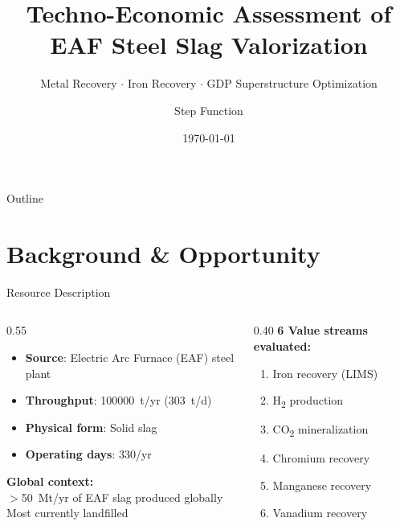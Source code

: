 \documentclass[aspectratio=169]{beamer}
\title{Techno-Economic Assessment of\\[4pt] \textbf{EAF Steel Slag} Valorization}
\subtitle{Metal Recovery \(\cdot\) Iron Recovery \(\cdot\) GDP Superstructure Optimization}
\author{Step Function}
\date{\today}
\begin{document}
\begin{frame}
\titlepage
\end{frame}

\begin{frame}{Outline}
\tableofcontents
\end{frame}

\section{Background \& Opportunity}

\begin{frame}{Resource Description}
\begin{columns}[T]
\begin{column}{0.55\textwidth}
\begin{itemize}
\item \textbf{Source}: Electric Arc Furnace (EAF) steel plant
\item \textbf{Throughput}: \num{100000}~t/yr (303~t/d)
\item \textbf{Physical form}: Solid slag
\item \textbf{Operating days}: 330/yr
\end{itemize}
\vspace{1em}
\textbf{Global context:}\\
$>$50~Mt/yr of EAF slag produced globally\\
Most currently landfilled
\end{column}
\begin{column}{0.40\textwidth}
\textbf{6 Value streams evaluated:}
\begin{enumerate}
\item Iron recovery (LIMS)
\item H\textsubscript{2} production
\item CO\textsubscript{2} mineralization
\item Chromium recovery
\item Manganese recovery
\item Vanadium recovery
\end{enumerate}
\end{column}
\end{columns}
\end{frame}
\end{document}
